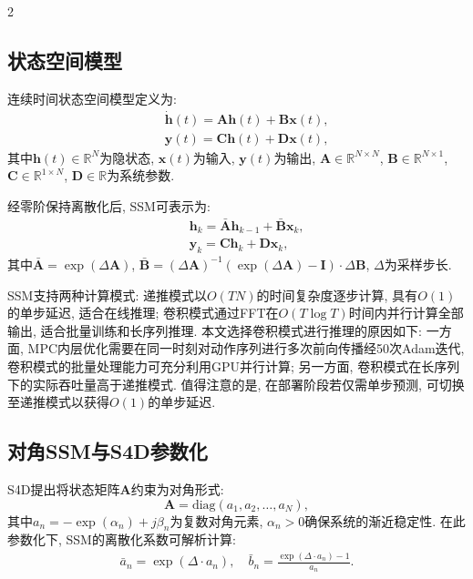 \begin{multicols}{2}
\subsection{状态空间模型}

连续时间状态空间模型定义为:
\begin{eqnarray}
&&\dot{{\bm h}}(t) = {\bm A}{\bm h}(t) + {\bm B}{\bm x}(t),\\
&&{\bm y}(t) = {\bm C}{\bm h}(t) + {\bm D}{\bm x}(t),
\end{eqnarray}
其中${\bm h}(t) \in \mathbb{R}^{N}$为隐状态, ${\bm x}(t)$为输入, ${\bm y}(t)$为输出,
${\bm A} \in \mathbb{R}^{N \times N}$, ${\bm B} \in \mathbb{R}^{N \times 1}$,
${\bm C} \in \mathbb{R}^{1 \times N}$, ${\bm D} \in \mathbb{R}$为系统参数.

经零阶保持离散化后, SSM可表示为:
\begin{eqnarray}
&&{\bm h}_k = \bar{{\bm A}}{\bm h}_{k-1} + \bar{{\bm B}}{\bm x}_k,\\
&&{\bm y}_k = {\bm C}{\bm h}_k + {\bm D}{\bm x}_k,
\end{eqnarray}
其中$\bar{{\bm A}} = \exp(\Delta {\bm A})$, $\bar{{\bm B}} = (\Delta {\bm A})^{-1}(\exp(\Delta {\bm A}) - {\bm I}) \cdot \Delta {\bm B}$,
$\Delta$为采样步长.

SSM支持两种计算模式: 递推模式以$O(TN)$的时间复杂度逐步计算, 具有$O(1)$的单步延迟, 适合在线推理; 卷积模式通过FFT在$O(T\log T)$时间内并行计算全部输出, 适合批量训练和长序列推理.
本文选择卷积模式进行推理的原因如下:
一方面, MPC内层优化需要在同一时刻对动作序列进行多次前向传播经50次Adam迭代, 卷积模式的批量处理能力可充分利用GPU并行计算; 另一方面, 卷积模式在长序列下的实际吞吐量高于递推模式.
值得注意的是, 在部署阶段若仅需单步预测, 可切换至递推模式以获得$O(1)$的单步延迟.

\subsection{对角SSM与S4D参数化}

S4D提出将状态矩阵${\bm A}$约束为对角形式:
\begin{equation}
{\bm A} = \text{diag}(a_1, a_2, \ldots, a_N),
\end{equation}
其中$a_n = -\exp(\alpha_n) + j\beta_n$为复数对角元素,
$\alpha_n > 0$确保系统的渐近稳定性.
在此参数化下, SSM的离散化系数可解析计算:
\begin{eqnarray}
\bar{a}_n = \exp(\Delta \cdot a_n), \quad
\bar{b}_n = \frac{\exp(\Delta \cdot a_n) - 1}{a_n}.
\end{eqnarray}


\end{multicols}
